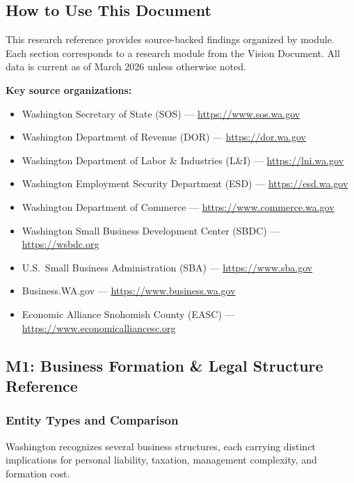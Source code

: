 \documentclass[11pt,letterpaper]{article}
\begin{document}
\subsection{How to Use This Document}

This research reference provides source-backed findings organized by module. Each section corresponds to a research module from the Vision Document. All data is current as of March 2026 unless otherwise noted.

\textbf{Key source organizations:}
\begin{itemize}[leftmargin=2em]
  \item Washington Secretary of State (SOS) --- \url{https://www.sos.wa.gov}
  \item Washington Department of Revenue (DOR) --- \url{https://dor.wa.gov}
  \item Washington Department of Labor \& Industries (L\&I) --- \url{https://lni.wa.gov}
  \item Washington Employment Security Department (ESD) --- \url{https://esd.wa.gov}
  \item Washington Department of Commerce --- \url{https://www.commerce.wa.gov}
  \item Washington Small Business Development Center (SBDC) --- \url{https://wsbdc.org}
  \item U.S.\ Small Business Administration (SBA) --- \url{https://www.sba.gov}
  \item Business.WA.gov --- \url{https://www.business.wa.gov}
  \item Economic Alliance Snohomish County (EASC) --- \url{https://www.economicalliancesc.org}
\end{itemize}

\subsection{M1: Business Formation \& Legal Structure Reference}

\subsubsection{Entity Types and Comparison}

Washington recognizes several business structures, each carrying distinct implications for personal liability, taxation, management complexity, and formation cost.
\end{document}
